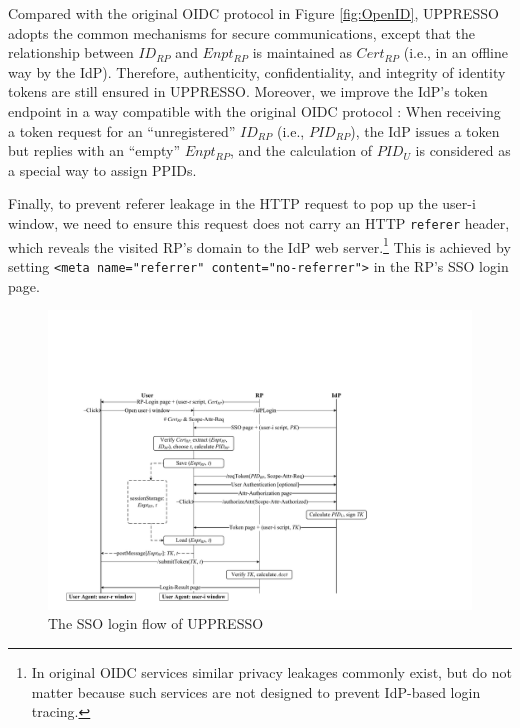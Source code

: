 Compared with the original OIDC protocol in Figure \ref{fig:OpenID},
UPPRESSO adopts the common mechanisms for secure communications,
except that the relationship between $ID_{RP}$ and $Enpt_{RP}$ is maintained as $Cert_{RP}$ (i.e., in an offline way by the IdP).
Therefore, authenticity, confidentiality, and integrity of identity tokens are still ensured in UPPRESSO.
Moreover, we improve the IdP's token endpoint in a way compatible with the original OIDC protocol \cite{rfc6749,OpenIDConnect}:
        When receiving a token request for an ``unregistered'' $ID_{RP}$ (i.e., $PID_{RP}$),
the IdP issues a token but replies with an ``empty'' $Enpt_{RP}$,
    and the calculation of $PID_{U}$ is considered as a special way to assign PPIDs.

Finally, to prevent referer leakage in the HTTP request to pop up the user-i window,
 we need to ensure this request does not carry an HTTP \texttt{referer} header, which reveals the visited RP's domain to the IdP web server.\footnote{In original OIDC services similar privacy leakages commonly exist, but do not matter because such services are not designed to prevent IdP-based login tracing.} %
%
This is achieved by setting
\verb+<meta name="referrer" content="no-referrer">+
in the RP's SSO login page.

\begin{figure}[htb]
  \centering
  \includegraphics[width=0.805\linewidth]{fig/pop-up-process.pdf}
  \caption{The SSO login flow of UPPRESSO}
  \label{fig:process}
\end{figure}



